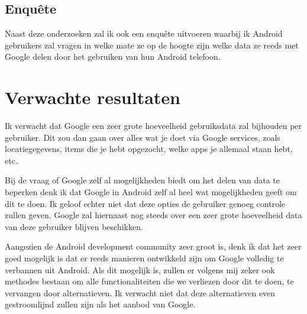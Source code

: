 \subsection{{Enquête}}

\noindent Naast deze onderzoeken zal ik ook een enquête uitvoeren waarbij ik Android gebruikers zal vragen in welke mate ze op de hoogte zijn welke data ze reeds met Google delen door het gebruiken van hun Android telefoon.

\section{Verwachte resultaten}
\label{sec:verwachte_resultaten}

Ik verwacht dat Google een zeer grote hoeveelheid gebruiksdata zal bijhouden per gebruiker. Dit zou dan gaan over alles wat je doet via Google services, zoals locatiegegevens, items die je hebt opgezocht, welke apps je allemaal staan hebt, etc.

\vspace{3mm}

\noindent Bij de vraag of Google zelf al mogelijkheden biedt om het delen van data te beperken denk ik dat Google in Android zelf al heel wat mogelijkheden geeft om dit te doen. Ik geloof echter niet dat deze opties de gebruiker genoeg controle zullen geven. Google zal hiernaast nog steeds over een zeer grote hoeveelheid data van deze gebruiker blijven beschikken.

\vspace{3mm}

\noindent Aangezien de Android development community zeer groot is, denk ik dat het zeer goed mogelijk is dat er reeds manieren ontwikkeld zijn om Google volledig te verbannen uit Android. Als dit mogelijk is, zullen er volgens mij zeker ook methodes bestaan om alle functionaliteiten die we verliezen door dit te doen, te vervangen door alternatieven. Ik verwacht niet dat deze alternatieven even gestroomlijnd zullen zijn als het aanbod van Google. 

\vspace{3mm}

